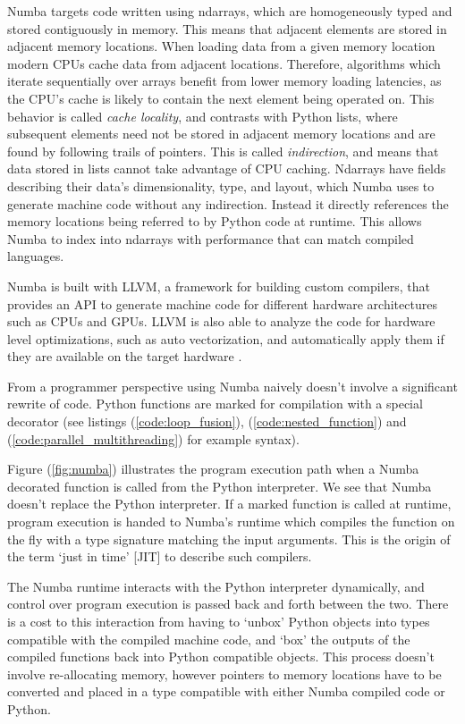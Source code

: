 \documentclass{IEEEcsmag}
\begin{document}
Numba targets code written using ndarrays, which are homogeneously typed and stored contiguously in memory. This means that adjacent elements are stored in adjacent memory locations. When loading data from a given memory location modern CPUs cache data from adjacent locations. Therefore, algorithms which iterate sequentially over arrays benefit from lower memory loading latencies, as the CPU's cache is likely to contain the next element being operated on. This behavior is called \textit{cache locality}, and contrasts with Python lists, where subsequent elements need not be stored in adjacent memory locations and are found by following trails of pointers. This is called \textit{indirection}, and means that data stored in lists cannot take advantage of CPU caching. Ndarrays have fields describing their data's dimensionality, type, and layout, which Numba uses to generate machine code without any indirection. Instead it directly references the memory locations being referred to by Python code at runtime. This allows Numba to index into ndarrays with performance that can match compiled languages.

Numba is built with LLVM, a framework for building custom compilers, that provides an API to generate machine code for different hardware architectures such as CPUs and GPUs. LLVM is also able to analyze the code for hardware level optimizations, such as auto vectorization, and automatically apply them if they are available on the target hardware \cite{Lattner2004}.

From a programmer perspective using Numba naively doesn't involve a significant rewrite of code. Python functions are marked for compilation with a special decorator (see listings (\ref{code:loop_fusion}), (\ref{code:nested_function}) and (\ref{code:parallel_multithreading}) for example syntax).

Figure (\ref{fig:numba}) illustrates the program execution path when a Numba decorated function is called from the Python interpreter. We see that Numba doesn't replace the Python interpreter. If a marked function is called at runtime, program execution is handed to Numba's runtime which compiles the function on the fly with a type signature matching the input arguments. This is the origin of the term `just in time' [JIT] to describe such compilers.

The Numba runtime interacts with the Python interpreter dynamically, and control over program execution is passed back and forth between the two. There is a cost to this interaction from having to `unbox' Python objects into types compatible with the compiled machine code, and `box' the outputs of the compiled functions back into Python compatible objects. This process doesn't involve re-allocating memory, however pointers to memory locations have to be converted and placed in a type compatible with either Numba compiled code or Python.
\end{document}
